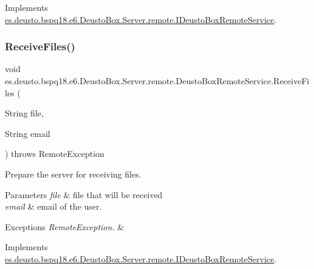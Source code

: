 Implements \mbox{\hyperlink{interfacees_1_1deusto_1_1bspq18_1_1e6_1_1_deusto_box_1_1_server_1_1remote_1_1_i_deusto_box_remote_service_a1d595efe4735a4977ec4d5d5e2f29bee}{es.\+deusto.\+bspq18.\+e6.\+Deusto\+Box.\+Server.\+remote.\+I\+Deusto\+Box\+Remote\+Service}}.

\mbox{\label{classes_1_1deusto_1_1bspq18_1_1e6_1_1_deusto_box_1_1_server_1_1remote_1_1_deusto_box_remote_service_ae5c7e627a97bbc28925516e8af17fbc6}} 
\subsubsection{\texorpdfstring{Receive\+Files()}{ReceiveFiles()}}
{\footnotesize\ttfamily void es.\+deusto.\+bspq18.\+e6.\+Deusto\+Box.\+Server.\+remote.\+Deusto\+Box\+Remote\+Service.\+Receive\+Files (\begin{DoxyParamCaption}\item[{String}]{file,  }\item[{String}]{email }\end{DoxyParamCaption}) throws Remote\+Exception}

Prepare the server for receiving files.


\begin{DoxyParams}{Parameters}
{\em file} & file that will be received \\
\hline
{\em email} & email of the user. \\
\hline
\end{DoxyParams}

\begin{DoxyExceptions}{Exceptions}
{\em Remote\+Exception.} & \\
\hline
\end{DoxyExceptions}


Implements \mbox{\hyperlink{interfacees_1_1deusto_1_1bspq18_1_1e6_1_1_deusto_box_1_1_server_1_1remote_1_1_i_deusto_box_remote_service_aac41850e4367aa1213777b0e9ea3c213}{es.\+deusto.\+bspq18.\+e6.\+Deusto\+Box.\+Server.\+remote.\+I\+Deusto\+Box\+Remote\+Service}}.

